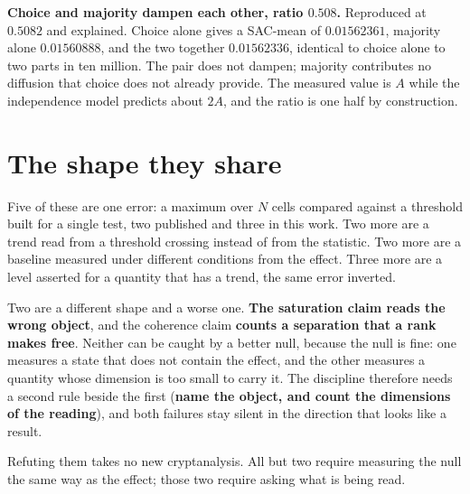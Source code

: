 \textbf{Choice and majority dampen each other, ratio \(0.508\).} Reproduced at \(0.5082\) and explained. Choice alone gives a SAC-mean of \(0.01562361\), majority alone \(0.01560888\), and the two together \(0.01562336\), identical to choice alone to two parts in ten million. The pair does not dampen; majority contributes no diffusion that choice does not already provide. The measured value is \(A\) while the independence model predicts about \(2A\), and the ratio is one half by construction.

\section{The shape they share}

Five of these are one error: a maximum over \(N\) cells compared against a threshold built for a single test, two published and three in this work. Two more are a trend read from a threshold crossing instead of from the statistic. Two more are a baseline measured under different conditions from the effect. Three more are a level asserted for a quantity that has a trend, the same error inverted.

Two are a different shape and a worse one. \textbf{The saturation claim reads the wrong object}, and the coherence claim \textbf{counts a separation that a rank makes free}. Neither can be caught by a better null, because the null is fine: one measures a state that does not contain the effect, and the other measures a quantity whose dimension is too small to carry it. The discipline therefore needs a second rule beside the first (\textbf{name the object, and count the dimensions of the reading}), and both failures stay silent in the direction that looks like a result.

Refuting them takes no new cryptanalysis. All but two require measuring the null the same way as the effect; those two require asking what is being read.

